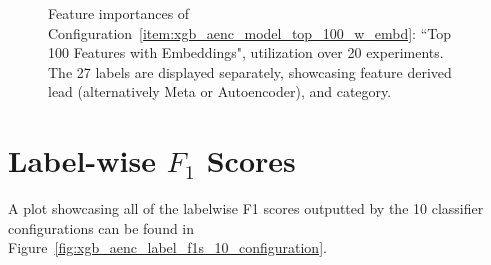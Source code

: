 \documentclass[\main/thesis.tex]{subfiles}
\begin{document}
\begin{appendices}
\begin{figure}[t]
    \centering
    \caption{Feature importances of Configuration~\ref{item:xgb_aenc_model_top_100_w_embd}: ``Top 100 Features with Embeddings", utilization over 20 experiments. The 27 labels are displayed separately, showcasing feature derived lead (alternatively Meta or Autoencoder), and category.}
    \label{fig:xgb_aenc_top_100_features_labelwise}
\end{figure}

\section{Label-wise $F_1$ Scores}

A plot showcasing all of the labelwise F1 scores outputted by the 10 classifier configurations can be found in Figure~\ref{fig:xgb_aenc_label_f1s_10_configuration}.


\end{appendices}
\end{document}
